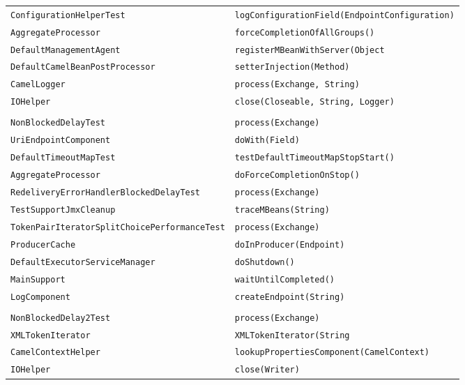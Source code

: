 \begin{center}
\begin{longtable}{ll}
\lstinline/ConfigurationHelperTest/&{\lstinline/logConfigurationField(EndpointConfiguration)/}\\
\lstinline/AggregateProcessor/&{\lstinline/forceCompletionOfAllGroups()/}\\
\lstinline/DefaultManagementAgent/&{\lstinline/registerMBeanWithServer(Object/}\\
\lstinline/DefaultCamelBeanPostProcessor/&{\hspace*{-3pt}\lstinline/setterInjection(Method)/}\\
\lstinline/CamelLogger/&{\lstinline/process(Exchange, String)/}\\
\lstinline/IOHelper/&{\lstinline/close(Closeable, String, Logger)/}\\
\raisebox{-13pt}{\shortstack{\lstinline/AsyncEndpointRedeliveryErrorHandler/-\\\lstinline/NonBlockedDelayTest/}}&{\lstinline/process(Exchange)/}\\
\lstinline/UriEndpointComponent/&{\lstinline/doWith(Field)/}\\
\lstinline/DefaultTimeoutMapTest/&{\lstinline/testDefaultTimeoutMapStopStart()/}\\
\lstinline/AggregateProcessor/&{\lstinline/doForceCompletionOnStop()/}\\
\lstinline/RedeliveryErrorHandlerBlockedDelayTest/&{\lstinline/process(Exchange)/}\\
\lstinline/TestSupportJmxCleanup/&{\lstinline/traceMBeans(String)/}\\
\lstinline/TokenPairIteratorSplitChoicePerformanceTest/&{\lstinline/process(Exchange)/}\\
\lstinline/ProducerCache/&{\lstinline/doInProducer(Endpoint)/}\\
\lstinline/DefaultExecutorServiceManager/&{\lstinline/doShutdown()/}\\
\lstinline/MainSupport/&{\lstinline/waitUntilCompleted()/}\\
\lstinline/LogComponent/&{\lstinline/createEndpoint(String)/}\\
\raisebox{-13pt}{\shortstack{\lstinline/AsyncEndpointRedeliveryErrorHandler/-\\\lstinline/NonBlockedDelay2Test/}}&{\lstinline/process(Exchange)/}\\
\lstinline/XMLTokenIterator/&{\lstinline/XMLTokenIterator(String/}\\
\lstinline/CamelContextHelper/&{\lstinline/lookupPropertiesComponent(CamelContext)/}\\
\lstinline/IOHelper/&{\lstinline/close(Writer)/}\\

\end{longtable}
\end{center}

